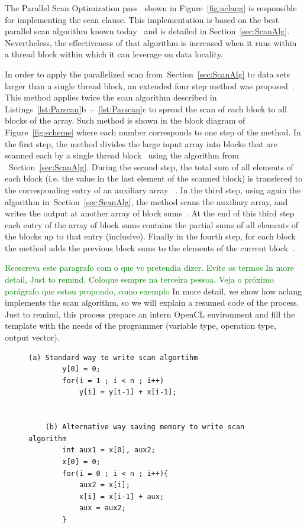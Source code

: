 \documentclass[Ingles]{ic-tese-v1}
\newcommand{\marcio}[1]{\textcolor{green}{ {#1}}}
\newcommand{\marcio}[1]{}
\newcommand{\rsec}[1]{Section~\ref{sec:#1}}
\newcommand{\rfig}[1]{Figure~\ref{fig:#1}}
\newcommand{\rlstn}[3]{Listings~\ref{lst:#1}{#2}~--~\ref{lst:#1}{#3}}
\begin{document}
The Parallel Scan Optimization  pass~ shown in \rfig{aclang}
is responsible  for implementing the scan  clause. This implementation
is    based   on    the   best    parallel   scan    algorithm   known
today~\cite{Sengupta:2007}       and       is       detailed       in
\rsec{ScanAlg}.  Nevertheless, the  effectiveness  of  that algorithm  is
increased  when it  runs within  a thread  block within  which it  can
leverage on data locality.

In order to apply the  parallelized scan from~\rsec{ScanAlg} to data sets
larger than  a single thread block,  an extended four step  method was
proposed~\cite{harris2007parallel}. This method applies twice the  scan
algorithm described in \rlstn{Parscan}{b}{c} to spread the scan of each
block to all blocks  of the array.  Such method is  shown in the block
diagram of \rfig{scheme} where each  number corresponds to one step of
the method.   In the first  step, the  method divides the  large input
array  into  blocks  that  are   scanned  each  by  a  single  thread
block~ using  the algorithm  from ~\rsec{ScanAlg}.   During the
second step,  the total sum  of all elements  of each block  (i.e. the
value in the  last element of the scanned block)  is transfered to the
corresponding entry of  an auxiliary array ~.   In the third
step, using again  the algorithm in~\rsec{ScanAlg}, the  method scans the
auxiliary  array, and  writes the  output  at another  array of  block
sums~.  At  the end  of this  third step  each entry  of the
array of block  sums contains the partial sums of  all elements of the
blocks up to that entry (inclusive).   Finally in the fourth step,
for each block the method adds the previous block sums  to the elements of the current
block~.

\marcio{Reescreva este paragrafo com o que vc pretendia dizer. Evite os termos
In more detail, Just to remind. Coloque sempre na terceira pessoa. Veja o
próximo parágrafo que estou propondo, como exemplo} In more detail, we show how
aclang implements the scan algorithm, so we will explain a resumed code of the
process. Just to remind, this process prepare an intern OpenCL environment and
fill the template with the needs of the programmer (variable type, operation
type, output vector).

\begin{figure}[t]
	\lstset{basicstyle=\scriptsize}
	\begin{lstlisting}[label=lst:ScanKind, caption={Pseudocode of Scan Parallel implementation in Aclang}, escapeinside={}]
	(a) Standard way to write scan algortihm
		y[0] = 0;
		for(i = 1 ; i < n ; i++)
			y[i] = y[i-1] + x[i-1];


	(b) Alternative way saving memory to write scan algorithm
		int aux1 = x[0], aux2;
		x[0] = 0;
		for(i = 0 ; i < n ; i++){
			aux2 = x[i];
			x[i] = x[i-1] + aux;
			aux = aux2;
		}

	\end{lstlisting}
\end{figure}
\end{document}
